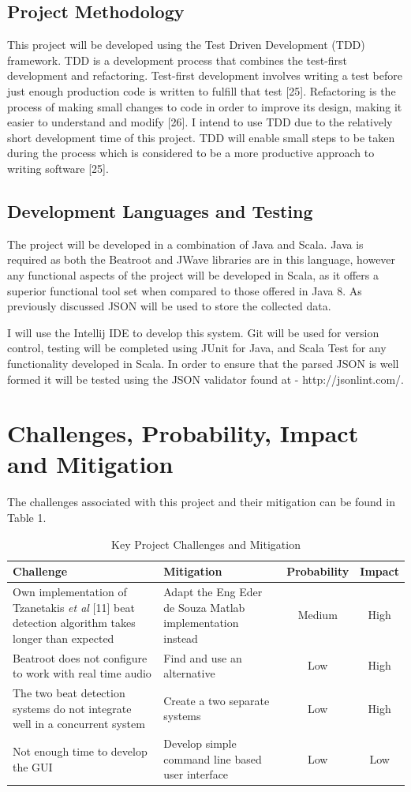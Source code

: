 \documentclass[a4paper, 11pt]{article}
\begin{document}
\subsection{Project Methodology}
This project will be developed using the Test Driven Development (TDD) framework. TDD is a development process that combines the test-first development and refactoring. Test-first development involves writing a test before just enough production code is written to fulfill that test [25]. Refactoring is the process of making small changes to code in order to improve its design, making it easier to understand and modify [26]. I intend to use TDD due to the relatively short development time of this project. TDD will enable small steps to be taken during the process which is considered to be a more productive approach to writing software [25].

\subsection{Development Languages and Testing}
The project will be developed in a combination of Java and Scala. Java is required as both the Beatroot and JWave libraries are in this language, however any functional aspects of the project will be developed in Scala, as it offers a superior functional tool set when compared to those offered in Java 8. As previously discussed JSON will be used to store the collected data.

I will use the Intellij IDE to develop this system. Git will be used for version control, testing will be completed using JUnit for Java, and Scala Test for any functionality developed in Scala. In order to ensure that the parsed JSON is well formed it will be tested using the JSON validator found at - http://jsonlint.com/.

\section{Challenges, Probability, Impact and Mitigation}
The challenges associated with this project and their mitigation can be found in Table 1.
\begin{table}[h]
\caption{Key Project Challenges and Mitigation} 
\centering
\begin{tabular}{|p{6cm}|p{6cm}|c|c|}
 \hline
\textbf{Challenge} & \textbf{Mitigation} & \textbf{Probability} & \textbf{Impact}\\ [0.5ex]
\hline 
Own implementation of Tzanetakis \textit{et al} [11] beat detection algorithm takes longer than expected & Adapt the Eng Eder de Souza Matlab implementation instead & Medium & High\\
\hline
Beatroot does not configure to work with real time audio & Find and use an alternative & Low & High\\ 
\hline
The two beat detection systems do not integrate well in a concurrent system & Create a two separate systems & Low & High\\
\hline
Not enough time to develop the GUI & Develop simple command line based user interface & Low & Low\\
\hline
\end{tabular}
\end{table}
\end{document}
